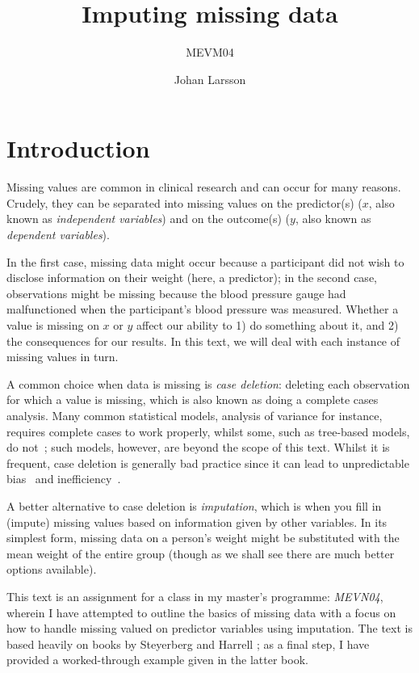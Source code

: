\documentclass[headinclude=true, headsepline=true, DIV14]{scrartcl}\usepackage[]{graphicx}\usepackage[]{color}
\title{Imputing missing data}
\subtitle{MEVM04}
\author{Johan Larsson}
\begin{document}
\maketitle

\section{Introduction}

Missing values are common in clinical research and can occur for many reasons.
Crudely, they can be separated into missing values on the predictor(s) ($x$, also
known as \emph{independent variables}) and on the outcome(s) ($y$, also
known as \emph{dependent variables}). 

In the first case, missing data might occur because a participant did not wish
to disclose information on their weight (here, a predictor); in the second case,
observations might be missing because the blood pressure gauge had malfunctioned
when the participant's blood pressure was measured. Whether a value is missing
on $x$ or $y$ affect our ability to 1) do something about it, and 2) the
consequences for our results. In this text, we will deal with each
instance of missing values in turn.

A common choice when data is missing is \emph{case deletion}: deleting each observation
for which a value is missing, which is also known as doing a complete cases
analysis. Many common statistical models, analysis of variance for instance,
requires complete cases to work properly, whilst some, such as tree-based models,
do not~\cite{Kuhn_2013}; such models, however, are beyond the scope of this
text. Whilst it is frequent, case deletion is generally bad practice since it
can lead to unpredictable bias~\cite{knol_unpredictable_2010} and inefficiency~\cite{carpenterjames_multiple_2013}.

A better alternative to case deletion is \emph{imputation}, which is when
you fill in (impute) missing values based on information
given by other variables. In its simplest form, missing data on a person's
weight might be substituted with the mean weight of the entire group (though as
we shall see there are much better options available).

This text is an assignment for a class in my master's programme: \emph{MEVN04},
wherein I have attempted to outline the basics of missing data with a focus on
how to handle missing valued on predictor variables using imputation. The text 
is based heavily on books by Steyerberg \cite{steyerberg_clinical_2009} and 
Harrell \cite{Harrell_2015}; as a final step, I have provided a worked-through 
example given in the latter book.
\end{document}
